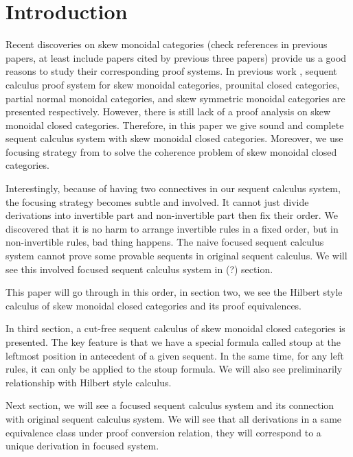 \documentclass{article}
\begin{document}
\section{Introduction}
Recent discoveries on skew monoidal categories \cite{szlachanyi_skew-monoidal_2012} \cite{lack_skew_2012} \cite{lack_triangulations_2014} (check references in previous papers, at least include papers cited by previous three papers) provide us a good reasons to study their corresponding proof systems.
In previous work \cite{uustalu_sequent_2018} \cite{uustalu_deductive_nodate} \cite{uustalu_proof_nodate} \cite{veltri_coherence_2021}, sequent calculus proof system for skew monoidal categories, prounital closed categories, partial normal monoidal categories, and skew symmetric monoidal categories are presented respectively.
However, there is still lack of a proof analysis on skew monoidal closed categories.
Therefore, in this paper we give sound and complete sequent calculus system with skew monoidal closed categories.
Moreover, we use focusing strategy from \cite{andreoli_logic_1992} to solve the coherence problem of skew monoidal closed categories.

Interestingly, because of having two connectives in our sequent calculus system, the focusing strategy becomes subtle and involved.
It cannot just divide derivations into invertible part and non-invertible part then fix their order.
We discovered that it is no harm to arrange invertible rules in a fixed order, but in non-invertible rules, bad thing happens.
The naive focused sequent calculus system cannot prove some provable sequents in original sequent calculus.
We will see this involved focused sequent calculus system in (?) section.

This paper will go through in this order, in section two, we see the Hilbert style calculus of skew monoidal closed categories and its proof equivalences.

In third section, a cut-free sequent calculus of skew monoidal closed categories is presented.
The key feature is that we have a special formula called stoup at the leftmost position in antecedent of a given sequent.
In the same time, for any left rules, it can only be applied to the stoup formula.
We will also see preliminarily relationship with Hilbert style calculus.

Next section, we will see a focused sequent calculus system and its connection with original sequent calculus system.
We will see that all derivations in a same equivalence class under proof conversion relation, they will correspond to a unique derivation in focused system.
\end{document}
